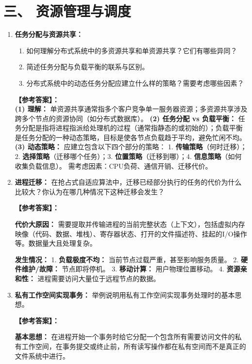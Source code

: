 \documentclass[a4paper,12pt]{article}
\newcommand{\answer}[1]{\par\vspace{0.5em}\hspace{2em}\textbf{【参考答案】：}\\{\color{blue}#1}\par\vspace{1em}}
\begin{document}
\section{三、 资源管理与调度}

\begin{enumerate}[label=\arabic*.]
    \item \textbf{任务分配与资源共享：}
    \begin{enumerate}
        \item 如何理解分布式系统中的多资源共享和单资源共享？它们有哪些异同？
        \item 简述任务分配与负载平衡的联系与区别。
        \item 分布式系统中的动态任务分配应建立什么样的策略？需要考虑哪些因素？
    \end{enumerate}

    \answer{
    \textbf{(1) 理解：} 单资源共享通常指多个客户竞争单一服务器资源；多资源共享涉及跨多个节点的资源协同（如分布式数据库）。
    \textbf{(2) 任务分配 vs 负载平衡：} 任务分配是指将进程指派给处理机的过程（通常指静态的或初始的）；负载平衡是任务分配的一种动态策略，目标是使各节点负载趋于平均，避免忙闲不均。
    \textbf{(3) 动态策略：} 应建立包含以下四个部分的策略：
    1. \textbf{传输策略}（何时迁移）；2. \textbf{选择策略}（迁移哪个任务）；3. \textbf{位置策略}（迁移到哪）；4. \textbf{信息策略}（如何收集负载信息）。
    需考虑因素：CPU负荷、通信开销、迁移代价。
    }

    \item \textbf{进程迁移：}
    在抢占式自适应算法中，迁移已经部分执行的任务的代价为什么比较大？你认为在哪几种情况下这种迁移会发生？

    \answer{
    \textbf{代价大原因：} 需要提取并传输进程的当前完整状态（上下文），包括虚拟内存映像（代码、数据、堆栈）、寄存器状态、打开的文件描述符、挂起的I/O操作等。数据量大且处理复杂。
    
    \textbf{发生情况：}
    1. \textbf{负载极度不均：} 当前节点过载严重，甚至影响服务质量。
    2. \textbf{硬件维护/故障：} 节点即将停机。
    3. \textbf{移动计算：} 用户物理位置移动。
    4. \textbf{资源亲和性：} 进程需要访问大量位于远程节点的数据。
    }

    \item \textbf{私有工作空间实现事务：}
    举例说明用私有工作空间实现事务处理时的基本思想。
    
    \answer{
    \textbf{基本思想：} 在进程开始一个事务时给它分配一个包含所有需要访问文件的私有工作空间，在事务提交或终止前，所有读写操作都在私有空间而不是真正的文件系统中进行。
    
}
\end{enumerate}
\end{document}
